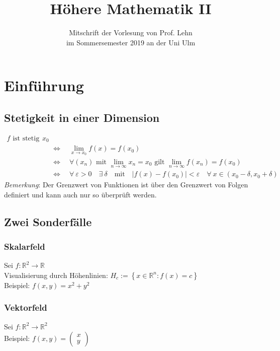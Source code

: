 \documentclass[11pt,a4paper]{book}
\title{Höhere Mathematik II}
\author{Mitschrift der Vorlesung von Prof. Lehn\\im Sommersemester 2019 an der Uni Ulm}
\newcommand {\R}	{\mathbb{R}}
\newcommand {\Rn}	{\mathbb{R}^n}
\newcommand {\Rzwei}	{\mathbb{R}^2}
\newcommand{\1}    	{\mathbbm{1}}
\newcommand{\Bemerkung}	{\noindent\textit{Bemerkung}: }
\begin{document}
\maketitle
\tableofcontents 

\chapter*{Einführung}
\section{Stetigkeit in einer Dimension}
\begin{align*}
	f \textrm{ ist stetig in } x_0 & \\
	&\quad \Leftrightarrow \quad
	\lim_{x \rightarrow x_0} f(x) = f(x_0) \\
	&\quad \Leftrightarrow \quad
	\forall \left(x_n\right) \textrm{ mit } \lim_{n \rightarrow \infty} x_n = x_0
	\textrm{ gilt }  \lim_{n \rightarrow \infty} f(x_n) = f(x_0) \\
	&\quad \Leftrightarrow \quad \forall~ \varepsilon > 0 \quad \exists~ \delta \quad \textrm{mit} \quad \vert f(x) - f(x_0) \vert < \varepsilon \quad \forall~ x \in \left( x_0 - \delta, x_0 + \delta \right)
\end{align*}
\Bemerkung Der Grenzwert von Funktionen ist über den Grenzwert von Folgen definiert und kann auch nur so überprüft werden.

\section{Zwei Sonderfälle}
\subsection*{Skalarfeld}
Sei \( f : \Rzwei \rightarrow \R \) \\
Visualisierung durch Höhenlinien: \( H_c := \left\{ x \in \Rn : f(x) = c \right\} \) \\
Beispiel: \( f(x,y) = x^2 + y^2 \)

\subsection*{Vektorfeld}
Sei \( f : \Rzwei \rightarrow \Rzwei \) \\
Beispiel: \(f(x,y) = \left(\begin{array}{c} x \\ y \end{array} \right)\)
\end{document}
